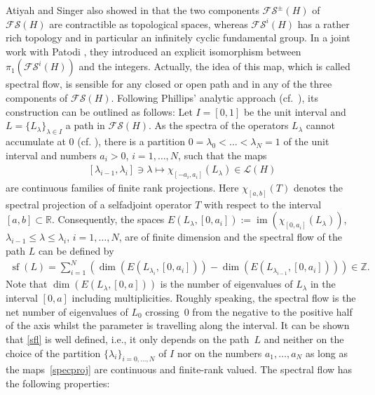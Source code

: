 \documentclass[pdftex]{sigma}
\numberwithin{equation}{section}
\theoremstyle{definition}
\DeclareMathOperator{\im}{im}
\DeclareMathOperator{\sfl}{sf}
\begin{document}
Atiyah and Singer also showed in \cite{AtiyahSinger} that the two components $\mathcal{FS}^\pm(H)$ of $\mathcal{FS}(H)$ are contractible as topological spaces, whereas $\mathcal{FS}^i(H)$ has a rather rich topology and in particular an infinitely cyclic fundamental group. In a joint work with Patodi \cite{AtiyahPatodi}, they introduced an explicit isomorphism between $\pi_1(\mathcal{FS}^i(H))$ and the integers. Actually, the idea of this map, which is called spectral flow, is sensible for any closed or open path and in any of the three components of $\mathcal{FS}(H)$. Following Phillips' analytic approach \cite{Phillips} (cf.~\cite{book}), its construction can be outlined as follows: Let $I=[0,1]$ be the unit interval and $L=\{L_\lambda\}_{\lambda\in I}$ a path in $\mathcal{FS}(H)$. As the spectra of the operators $L_\lambda$ cannot accumulate at $0$ (cf. \cite{ProcHan,Fredholm}), there is a partition $0=\lambda_0<\dots< \lambda_N=1$ of the unit interval and numbers $a_i>0$, $i=1,\dots, N$, such that the maps
\begin{align}\label{specproj}
[\lambda_{i-1},\lambda_i]\ni \lambda\mapsto\chi_{[-a_i,a_i]}(L_\lambda)\in\mathcal{L}(H)
\end{align}
are continuous families of finite rank projections. Here $\chi_{[a,b]}(T)$ denotes the spectral projection of a selfadjoint operator $T$ with respect to the interval $[a,b]\subset\mathbb{R}$. Consequently, the spaces $E(L_\lambda,[0,a_i]):=\im(\chi_{[0,a_i]}(L_\lambda))$, $\lambda_{i-1}\leq \lambda\leq \lambda_i$, $i=1,\dots,N$, are of finite dimension and the spectral flow of the path $L$ can be defined by
\begin{align}\label{sfl}
\sfl(L)=\sum^N_{i=1}{(\dim(E(L_{\lambda_i},[0,a_i]))-\dim(E(L_{\lambda_{i-1}},[0,a_i])))}\in\mathbb{Z}.
\end{align}
Note that $\dim(E(L_\lambda,[0,a]))$ is the number of eigenvalues of $L_\lambda$ in the interval $[0,a]$ including multiplicities. Roughly speaking, the spectral flow is the net number of eigenvalues of $L_0$ crossing~$0$ from the negative to the positive half of the axis whilst the parameter is travelling along the interval. It can be shown that \eqref{sfl} is well defined, i.e., it only depends on the path~$L$ and neither on the choice of the partition $\{\lambda_i\}_{i=0,\dots,N}$ of $I$ nor on the numbers $a_1,\dots,a_N$ as long as the maps~\eqref{specproj} are continuous and finite-rank valued. The spectral flow has the following properties:
\end{document}
